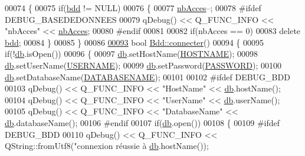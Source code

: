 \begin{DoxyCode}
00074 \{
00075     \textcolor{keywordflow}{if}(\hyperlink{class_bdd_a09bd3b3a31feedf3dd42a507e0249213}{bdd} != NULL)
00076     \{
00077         \hyperlink{class_bdd_a9fb6aa118a28c27307f27fd7662e462d}{nbAcces}--;
00078 \textcolor{preprocessor}{        #ifdef DEBUG\_BASEDEDONNEES}
00079         qDebug() << Q\_FUNC\_INFO << \textcolor{stringliteral}{"nbAcces"} << \hyperlink{class_bdd_a9fb6aa118a28c27307f27fd7662e462d}{nbAcces};
00080 \textcolor{preprocessor}{        #endif}
00081 
00082         \textcolor{keywordflow}{if}(nbAcces == 0)
00083             \textcolor{keyword}{delete} \hyperlink{class_bdd_a09bd3b3a31feedf3dd42a507e0249213}{bdd};
00084     \}
00085 \}
00086 
\hyperlink{class_bdd_a1a234e773787295f521d66685149176b}{00093} \textcolor{keywordtype}{bool} \hyperlink{class_bdd_a1a234e773787295f521d66685149176b}{Bdd::connecter}()
00094 \{
00095     \textcolor{keywordflow}{if}(!\hyperlink{class_bdd_a8628c1686deda86999f86689c3e7268e}{db}.isOpen())
00096     \{
00097         \hyperlink{class_bdd_a8628c1686deda86999f86689c3e7268e}{db}.setHostName(\hyperlink{_bdd_8h_a63ebf0552e7b4b8f37af87147904ffce}{HOSTNAME});
00098         \hyperlink{class_bdd_a8628c1686deda86999f86689c3e7268e}{db}.setUserName(\hyperlink{_bdd_8h_a3a747cf18fa28f0de7920de0f89f5144}{USERNAME});
00099         \hyperlink{class_bdd_a8628c1686deda86999f86689c3e7268e}{db}.setPassword(\hyperlink{_bdd_8h_a9e8538fad4eee548302ad9f60e6d47ca}{PASSWORD});
00100         \hyperlink{class_bdd_a8628c1686deda86999f86689c3e7268e}{db}.setDatabaseName(\hyperlink{_bdd_8h_aed52a1560b7fbe28f212643a9be8a139}{DATABASENAME});
00101 
00102 \textcolor{preprocessor}{        #ifdef DEBUG\_BDD}
00103         qDebug() << Q\_FUNC\_INFO << \textcolor{stringliteral}{"HostName"} << \hyperlink{class_bdd_a8628c1686deda86999f86689c3e7268e}{db}.hostName();
00104         qDebug() << Q\_FUNC\_INFO << \textcolor{stringliteral}{"UserName"} << \hyperlink{class_bdd_a8628c1686deda86999f86689c3e7268e}{db}.userName();
00105         qDebug() << Q\_FUNC\_INFO << \textcolor{stringliteral}{"DatabaseName"} << \hyperlink{class_bdd_a8628c1686deda86999f86689c3e7268e}{db}.databaseName();
00106 \textcolor{preprocessor}{        #endif}
00107         \textcolor{keywordflow}{if}(\hyperlink{class_bdd_a8628c1686deda86999f86689c3e7268e}{db}.open())
00108         \{
00109 \textcolor{preprocessor}{            #ifdef DEBUG\_BDD}
00110             qDebug() << Q\_FUNC\_INFO << QString::fromUtf8(\textcolor{stringliteral}{"connexion réussie à %
      \hyperlink{class_bdd_a8628c1686deda86999f86689c3e7268e}{db}.hostName());
}
\end{DoxyCode}
